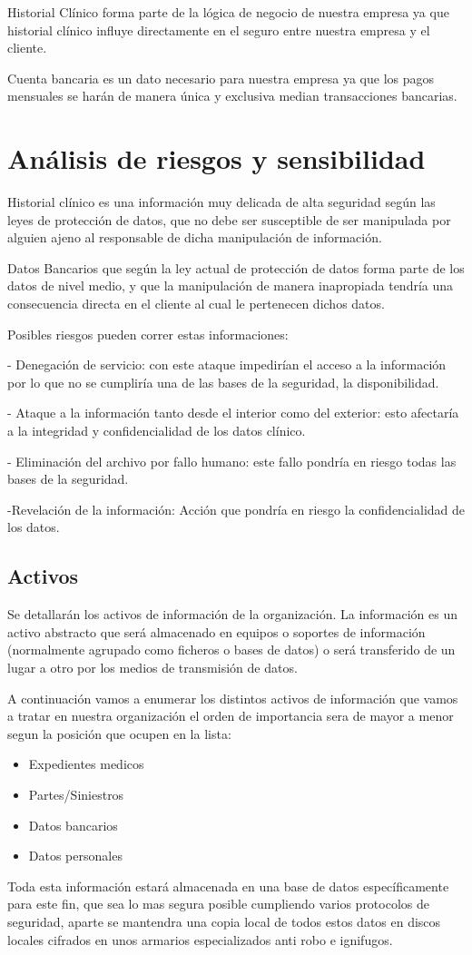 \documentclass[11pt,bibtotoc,noliststotoc,BCOR0mm]{scrbook}
\begin{document}
Historial Clínico forma parte de la lógica de negocio de nuestra empresa ya que historial clínico influye directamente en el seguro entre nuestra empresa y el cliente.

Cuenta bancaria es un dato necesario para nuestra empresa ya que los pagos mensuales se harán de manera única y exclusiva median transacciones bancarias.


\section{Análisis de riesgos y sensibilidad}

Historial clínico es una información muy delicada de alta seguridad según las leyes de protección de datos, que no debe ser susceptible de ser manipulada por alguien ajeno al responsable de dicha manipulación de información.

Datos Bancarios que según la ley actual de protección de datos forma parte de los datos de nivel medio, y que la manipulación de manera inapropiada tendría una consecuencia directa en el cliente al cual le pertenecen dichos datos.

Posibles riesgos pueden correr estas informaciones:

	- Denegación de servicio: con este ataque impedirían el acceso a la información por lo que no se cumpliría una de las bases de la seguridad, la disponibilidad.
    
	- Ataque a la información tanto desde el interior como del exterior: esto afectaría a la integridad y confidencialidad de los datos clínico.
    
	- Eliminación del archivo por fallo humano: este fallo pondría en riesgo todas las bases de la seguridad.
    
	-Revelación de la información: Acción que pondría en riesgo la confidencialidad de los datos.


\subsection{Activos}
Se detallarán los activos de información de la organización. 
La información es un activo abstracto que será almacenado en 
equipos o soportes de información (normalmente agrupado como ficheros o bases 
de datos) o será transferido de un lugar a otro por los medios de 
transmisión de datos. 

A continuación vamos a enumerar los distintos activos de información que vamos a tratar en nuestra organización el orden de importancia sera de mayor a menor segun la posición que ocupen en la lista:
\begin{itemize}
\item Expedientes medicos
\item Partes/Siniestros
\item Datos bancarios
\item Datos personales
\end{itemize}
Toda esta información estará almacenada en una base de datos específicamente para este fin, que sea lo mas segura posible cumpliendo varios protocolos de seguridad, aparte se mantendra una copia local de todos estos datos en discos locales cifrados en unos armarios especializados anti robo e ignifugos.
\end{document}
